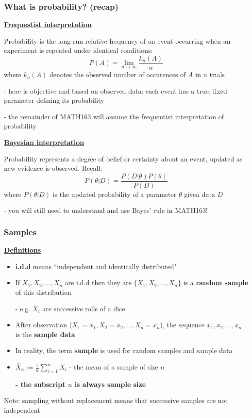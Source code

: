 \documentclass[t,8pt]{beamer}%
\begin{document}

\begin{frame}
		\frametitle{What is probability? (recap)}
		{\bf\underline{Frequestist interpretation}} \par
		Probability is the long-run relative frequency of an event occurring when an experiment is repeated under identical conditions:
		$$P(A)=\lim_{n\rightarrow\infty}\frac{k_n(A)}n$$
		where $k_n(A)$ denotes the observed number of occurences of $A$ in $n$ trials \par
		{\small\color{NavyBlue} - here is objective and based on observed data: each event has a true, fixed parameter defining its probability \par
			- the remainder of MATH163 will assume the frequentist interpretation of probability} \par
		{\bf\underline{Bayesian interpretation}} \par
		Probability represents a degree of belief or certainty about an event, updated as new evidence is observed. Recall:
		$$P(\theta\vert D)=\frac{P(D\vert\theta)P(\theta)}{P(D)}$$
		where $P(\theta\vert D)$ is the updated probability of a parameter $\theta$ given data $D$ \par
		{\small\color{NavyBlue} - you will still need to understand and use Bayes' rule in MATH163!}
\end{frame}

\begin{frame}
	\frametitle{Samples}
	{\bf\underline{Definitions}}
    \begin{itemize}
        \item {\bf i.d.d} means ``independent and identically distributed"
        \item If $X_1,X_2,\dots,X_n$ are i.d.d then they are $\lbrace X_1,X_2,\dots,X_n\rbrace$ is a {\bf random sample} of this distribution \par
        {\small\color{NavyBlue} - e.g. $X_i$ are successive rolls of a dice}
        \item After observation ($X_1=x_1,X_2=x_2,\dots,X_n=x_n$), the sequence $x_1,x_2,\dots,x_n$ is the {\bf sample data}
        \item In reality, the term {\bf sample} is used for random samples and sample data
        \item $\bar X_n:=\frac 1n\sum_{i=1}^nX_i$ - the mean of a sample of size $n$ \par
        {\bf - the subscript $n$ is always sample size}
    \end{itemize}
    Note: sampling without replacement means that successive samples are not independent
\end{frame}
\end{document}
